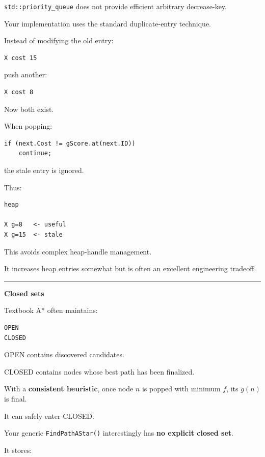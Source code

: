 \texttt{std::priority\_queue} does not provide efficient arbitrary decrease-key.

Your implementation uses the standard duplicate-entry technique.

Instead of modifying the old entry:

\begin{verbatim}
X cost 15
\end{verbatim}

push another:

\begin{verbatim}
X cost 8
\end{verbatim}

Now both exist.

When popping:

\begin{verbatim}
if (next.Cost != gScore.at(next.ID))
    continue;
\end{verbatim}

the stale entry is ignored.

Thus:

\begin{verbatim}
heap

X g=8   <- useful
X g=15  <- stale
\end{verbatim}

This avoids complex heap-handle management.

It increases heap entries somewhat but is often an excellent engineering tradeoff.

\begin{center}\rule{0.5\linewidth}{0.5pt}\end{center}

\textbf{Closed sets}

Textbook A* often maintains:

\begin{verbatim}
OPEN
CLOSED
\end{verbatim}

OPEN contains discovered candidates.

CLOSED contains nodes whose best path has been finalized.

With a \textbf{consistent heuristic}, once node \(n\) is popped with minimum \(f\), its \(g(n)\) is final.

It can safely enter CLOSED.

Your generic \texttt{FindPathAStar()} interestingly has \textbf{no explicit closed set}.

It stores:


